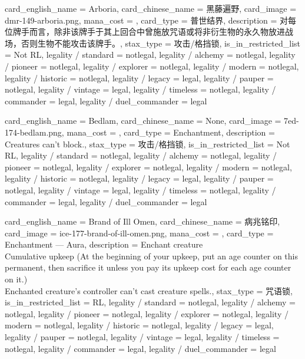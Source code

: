 \documentclass[lang = cn, color = black, 10pt]{AllThatStax}
\begin{document}
\card
{
	card_english_name = {Arboria},
	card_chinese_name = {黑藤遍野},
	card_image = dmr-149-arboria.png,
	mana_cost = ,
	card_type = 普世结界,
	description = {对每位牌手而言，除非该牌手于其上回合中曾施放咒语或将非衍生物的永久物放进战场，否则生物不能攻击该牌手。},
	stax_type = 攻击/格挡锁,
	is_in_restricted_list = Not RL,
	legality / standard = notlegal,
	legality / alchemy = notlegal,
	legality / pioneer = notlegal,
	legality / explorer = notlegal,
	legality / modern = notlegal,
	legality / historic = notlegal,
	legality / legacy = legal,
	legality / pauper = notlegal,
	legality / vintage = legal,
	legality / timeless = notlegal,
	legality / commander = legal,
	legality / duel_commander = legal
}

\card
{
	card_english_name = {Bedlam},
	card_chinese_name = {None},
	card_image = 7ed-174-bedlam.png,
	mana_cost = ,
	card_type = Enchantment,
	description = {Creatures can't block.},
	stax_type = 攻击/格挡锁,
	is_in_restricted_list = Not RL,
	legality / standard = notlegal,
	legality / alchemy = notlegal,
	legality / pioneer = notlegal,
	legality / explorer = notlegal,
	legality / modern = notlegal,
	legality / historic = notlegal,
	legality / legacy = legal,
	legality / pauper = notlegal,
	legality / vintage = legal,
	legality / timeless = notlegal,
	legality / commander = legal,
	legality / duel_commander = legal
}

\card
{
	card_english_name = {Brand of Ill Omen},
	card_chinese_name = {病兆铭印},
	card_image = ice-177-brand-of-ill-omen.png,
	mana_cost = ,
	card_type = Enchantment — Aura,
	description = {Enchant creature\\
		Cumulative upkeep  (At the beginning of your upkeep, put an age counter on this permanent, then sacrifice it unless you pay its upkeep cost for each age counter on it.)\\
		Enchanted creature's controller can't cast creature spells.},
	stax_type = 咒语锁,
	is_in_restricted_list = RL,
	legality / standard = notlegal,
	legality / alchemy = notlegal,
	legality / pioneer = notlegal,
	legality / explorer = notlegal,
	legality / modern = notlegal,
	legality / historic = notlegal,
	legality / legacy = legal,
	legality / pauper = notlegal,
	legality / vintage = legal,
	legality / timeless = notlegal,
	legality / commander = legal,
	legality / duel_commander = legal
}
\end{document}
